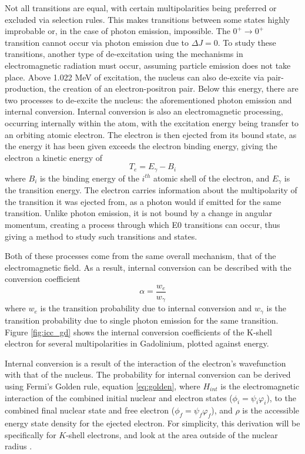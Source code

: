 Not all transitions are equal, with certain multipolarities being preferred or excluded via selection rules. This makes transitions between some states highly improbable or, in the case of photon emission, impossible. The $0^+\rightarrow0^+$ transition cannot occur via photon emission due to $\Delta J = 0$. To study these transitions, another type of de-excitation using the mechanisms in electromagnetic radiation must occur, assuming particle emission does not take place. Above 1.022 MeV of excitation, the nucleus can also de-excite via pair-production, the creation of an electron-positron pair. Below this energy, there are two processes to de-excite the nucleus: the aforementioned photon emission and internal conversion. Internal conversion is also an electromagnetic processing, occurring internally within the atom, with the excitation energy being transfer to an orbiting atomic electron. The electron is then ejected from its bound state, as the energy it has been given exceeds the electron binding energy, giving the electron a kinetic energy of 
\begin{equation}
    T_e = E_{\gamma}-B_i
\end{equation} 
where $B_i$ is the binding energy of the $i^{th}$ atomic shell of the electron, and $E_{\gamma}$ is the transition energy. The electron carries information about the multipolarity of the transition it was ejected from, as a photon would if emitted for the same transition. Unlike photon emission, it is not bound by a change in angular momentum, creating a process through which E0 transitions can occur, thus giving a method to study such transitions and states. 

Both of these processes come from the same overall mechanism, that of the electromagnetic field. As a result, internal conversion can be described with the conversion coefficient
\begin{equation}
\label{eq:conv_coeff}
    \alpha = \frac{w_e}{w_\gamma}
\end{equation}
where $w_e$ is the transition probability due to internal conversion and $w_\gamma$ is the transition probability due to single photon emission for the same transition. Figure \ref{fig:icc_gd} shows the internal conversion coefficients of the K-shell electron for several multipolarities in Gadolinium, plotted against energy.



Internal conversion is a result of the interaction of the electron's wavefunction with that of the nucleus. The probability for internal conversion can be derived using Fermi's Golden rule, equation \ref{eq:golden}, where $H_{int}$ is the electromagnetic interaction of the combined initial nuclear and electron states ($\phi_i=\psi_i\varphi_i$), to the combined final nuclear state and free electron ($\phi_f=\psi_f\varphi_f$), and $\rho$ is the accessible energy state density for the ejected electron. For simplicity, this derivation will be specifically for $K$-shell electrons, and look at the area outside of the nuclear radius \citep{roy67:_e0, blatt79:_emradiation, segre77:_icradiation}.

